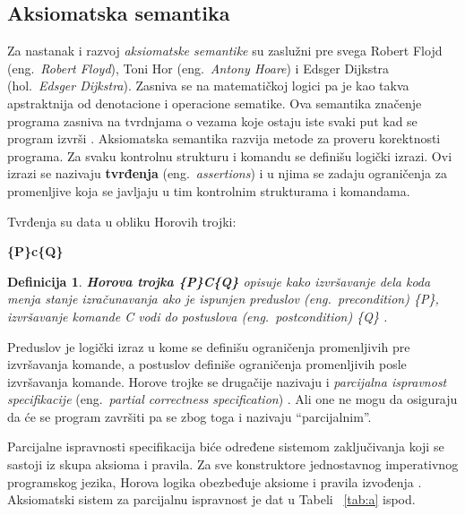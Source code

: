 \documentclass[a4paper]{article}
\newtheorem{definicija}{Definicija}[section]
\begin{document}
{\subsection{Aksiomatska semantika}
\label{sec:akssem}
\qquad Za nastanak i razvoj \textit{aksiomatske semantike}  su zaslužni pre svega Robert Flojd (eng.~{\em  Robert Floyd}), Toni Hor (eng.~{\em  Antony Hoare}) i Edsger Dijkstra (hol.~{\em Edsger Dijkstra}).
 Zasniva se na matematičkoj logici pa je kao takva apstraktnija od denotacione i operacione sematike. Ova semantika
 značenje programa zasniva na tvrdnjama o vezama koje ostaju iste svaki put kad se program izvrši \cite{slonneger1995book}.
 Aksiomatska semantika razvija metode za proveru korektnosti programa. Za svaku kontrolnu strukturu i komandu se definišu logički izrazi. Ovi izrazi se nazivaju \textbf{tvrđenja} (eng.~{\em  assertions}) i u njima se zadaju ograničenja za promenljive koja se javljaju u tim kontrolnim strukturama i komandama.

\begin{tcolorbox}
Tvrđenja su data u obliku Horovih trojki:

  \center \textbf{\{P\}c\{Q\}}

\end{tcolorbox}




\begin{definicija}
\textbf{Horova trojka \{P\}C\{Q\}} opisuje kako izvršavanje dela koda menja stanje izračunavanja ako je ispunjen preduslov (eng.~{\em  precondition}) \{P\}, izvršavanje komande C vodi do postuslova (eng.~{\em  postcondition}) \{Q\} \cite{milena} .

\end{definicija}

Preduslov je logički izraz u kome se definišu ograničenja promenljivih pre izvršavanja komande, a postuslov definiše ograničenja promenljivih posle izvršavanja komande.
Horove trojke se drugačije nazivaju i \textit{parcijalna ispravnost specifikacije } (eng.~{\em  partial correctness specification}) .
Ali one ne mogu da osiguraju da će se program završiti pa se zbog toga i nazivaju “parcijalnim”.

Parcijalne ispravnosti specifikacija biće određene sistemom zaključivanja koji se sastoji iz skupa aksioma i pravila. Za sve konstruktore jednostavnog imperativnog programskog jezika, Horova logika obezbeđuje aksiome i pravila izvođenja \cite{milena}. Aksiomatski sistem za parcijalnu ispravnost je dat u Tabeli ~\ref{tab:a} ispod.


}
\end{document}
